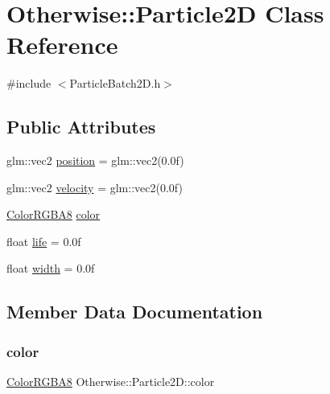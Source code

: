 \hypertarget{class_otherwise_1_1_particle2_d}{}\section{Otherwise\+:\+:Particle2D Class Reference}
\label{class_otherwise_1_1_particle2_d}


{\ttfamily \#include $<$Particle\+Batch2\+D.\+h$>$}

\subsection*{Public Attributes}
\begin{DoxyCompactItemize}
\item 
glm\+::vec2 \hyperlink{class_otherwise_1_1_particle2_d_aaaeaafa4501a28ca70bace09086c336d}{position} = glm\+::vec2(0.\+0f)
\item 
glm\+::vec2 \hyperlink{class_otherwise_1_1_particle2_d_a1259e5e0fef4cd2e727eeca0812c4a75}{velocity} = glm\+::vec2(0.\+0f)
\item 
\hyperlink{struct_otherwise_1_1_color_r_g_b_a8}{Color\+R\+G\+B\+A8} \hyperlink{class_otherwise_1_1_particle2_d_a8925e453269fcfdaf7f364a5aff3edad}{color}
\item 
float \hyperlink{class_otherwise_1_1_particle2_d_a686a8d10e2d6e70db199e2409c038601}{life} = 0.\+0f
\item 
float \hyperlink{class_otherwise_1_1_particle2_d_a11d1e450a3b1c05a7197fab0d4297a09}{width} = 0.\+0f
\end{DoxyCompactItemize}


\subsection{Member Data Documentation}
\mbox{\label{class_otherwise_1_1_particle2_d_a8925e453269fcfdaf7f364a5aff3edad}} 
\subsubsection{\texorpdfstring{color}{color}}
{\footnotesize\ttfamily \hyperlink{struct_otherwise_1_1_color_r_g_b_a8}{Color\+R\+G\+B\+A8} Otherwise\+::\+Particle2\+D\+::color}

\mbox{\label{class_otherwise_1_1_particle2_d_a686a8d10e2d6e70db199e2409c038601}} 
